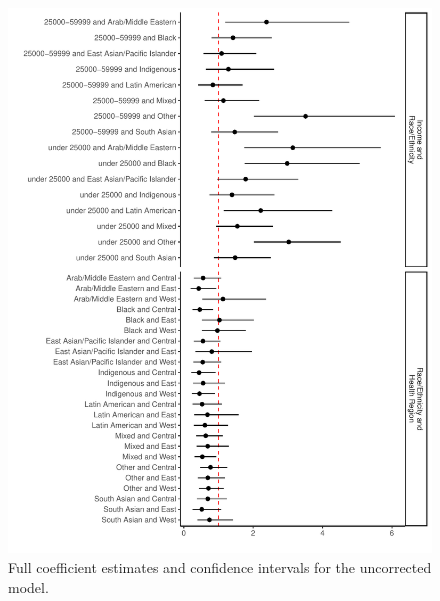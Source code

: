 \documentclass[
]{article}
\begin{document}
\begin{figure}

\includegraphics{appendix_files/figure-pdf/fig-model-uncorr-appendix-1.pdf} \hfill{}

\caption{\label{fig-model-uncorr-appendix}Full coefficient estimates and
confidence intervals for the uncorrected model.}

\end{figure}

\FloatBarrier
\end{document}
